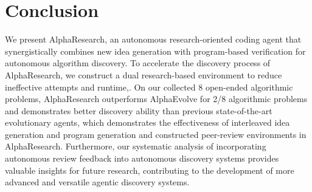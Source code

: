 \section{Conclusion}
We present AlphaResearch, an autonomous research-oriented coding agent that synergistically combines new idea generation with program-based verification for autonomous algorithm discovery. 
To accelerate the discovery process of AlphaResearch, we construct a dual research-based environment to reduce ineffective attempts and runtime,. 
On our collected 8 open-ended algorithmic problems, AlphaResearch outperforms AlphaEvolve for 2/8 algorithmic problems and demonstrates better discovery ability than previous state-of-the-art evolutionary agents, which demonstrates the effectiveness of interleaved idea generation and program generation and constructed peer-review environments in AlphaResearch. Furthermore, our systematic analysis of incorporating autonomous review feedback into autonomous discovery systems provides valuable insights for future research, contributing to the development of more advanced and versatile agentic discovery systems.





